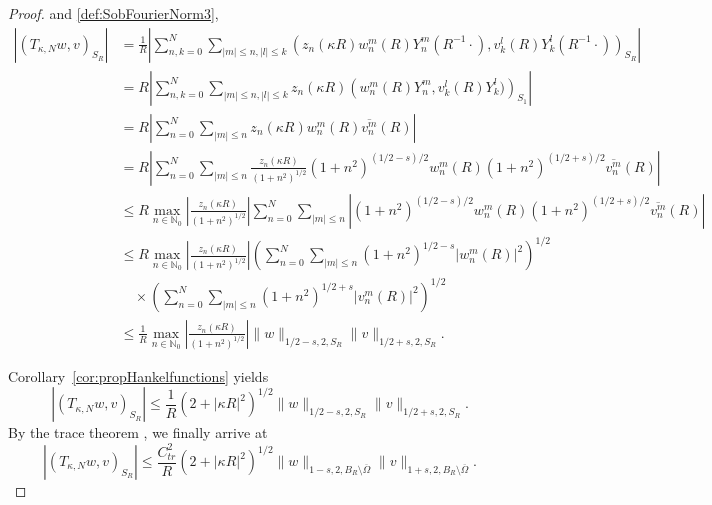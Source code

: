 \documentclass[12pt,DIV=14]{scrartcl}
\providecommand{\N}{\mathbb{N}}
\providecommand{\Om}{\Omega}
\begin{document}
\begin{proof}
and \eqref{def:SobFourierNorm3},
\begin{align*}
\left|(T_{\kappa,N} w,v)_{S_R}\right|
&= \frac{1}{R}\left|\sum_{n,k=0}^N\sum_{|m|\le n,|l|\le k}
\left(z_n(\kappa R)w_n^m(R)Y_n^m(R^{-1}\cdot),v_k^l(R)Y_k^l(R^{-1}\cdot)\right)_{S_R}\right|\\
&= R\left|\sum_{n,k=0}^N\sum_{|m|\le n,|l|\le k}
z_n(\kappa R)\left(w_n^m(R)Y_n^m,v_k^l(R)Y_k^l)\right)_{S_1}\right|\\
&= R\left|\sum_{n=0}^N\sum_{|m|\le n}
z_n(\kappa R) w_n^m(R)\overline{v_n^m}(R)\right|\\
&= R\left|\sum_{n=0}^N\sum_{|m|\le n}
\frac{z_n(\kappa R)}{(1+n^2)^{1/2}}(1+n^2)^{(1/2-s)/2}w_n^m(R)(1+n^2)^{(1/2+s)/2}\overline{v_n^m}(R)\right|\\
&\le R\max_{n\in\N_0}
\left|\frac{z_n(\kappa R)}{(1+n^2)^{1/2}}\right|
\sum_{n=0}^N\sum_{|m|\le n}\left|(1+n^2)^{(1/2-s)/2}w_n^m(R)(1+n^2)^{(1/2+s)/2}\overline{v_n^m}(R)\right|\\
&\le R\max_{n\in\N_0}
\left|\frac{z_n(\kappa R)}{(1+n^2)^{1/2}}\right|
\left(\sum_{n=0}^N\sum_{|m|\le n}(1+n^2)^{1/2-s}\left|w_n^m(R)\right|^2\right)^{1/2}\\
&\quad \times
\left(\sum_{n=0}^N\sum_{|m|\le n}(1+n^2)^{1/2+s}\left|v_n^m(R)\right|^2\right)^{1/2}\\
&\le \frac{1}{R}\max_{n\in\N_0}
\left|\frac{z_n(\kappa R)}{(1+n^2)^{1/2}}\right|\|w\|_{1/2-s,2,S_R}\|v\|_{1/2+s,2,S_R}.
\end{align*}

Corollary~\ref{cor:propHankelfunctions} yields
\begin{equation}\label{eq:TkuniformcontinuitySR3}
\left|(T_{\kappa,N} w,v)_{S_R}\right|
\le \frac{1}{R}\left(2 + |\kappa R|^2\right)^{1/2}\|w\|_{1/2-s,2,S_R}\|v\|_{1/2+s,2,S_R}.
\end{equation}
By the trace theorem \cite[Thm.~3.38]{McLean:00}, we finally arrive at
\[
\left|(T_{\kappa,N} w,v)_{S_R}\right|
\le \frac{C_{tr}^2}{R}\left(2 + |\kappa R|^2\right)^{1/2}
\|w\|_{1-s,2,B_R\setminus\overline\Om}\|v\|_{1+s,2,B_R\setminus\overline\Om}.
\]
\end{proof}
\end{document}
